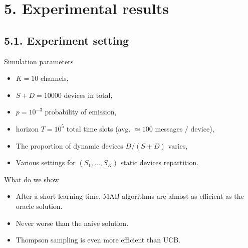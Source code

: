 \section{\hfill{}5. Experimental results\hfill{}}

\subsection{\hfill{}5.1. Experiment setting\hfill{}}

\begin{frameO}

    \begin{colorblock}{Simulation parameters}

        \begin{itemize}
            \tightlist
            \item
                  \(K = 10\) channels,
            \item
                  \(S + D = 10000\) devices in total,
            \item
                  \(p = 10^{-3}\) probability of emission,
            \item
                horizon \(T = 10^5\) total time slots (avg. \(\simeq 100\) messages \(/\)
                  device),
            \item
                  The proportion of dynamic devices \(D/(S+D)\) varies,
            \item
                  Various settings for \((S_1,\dots,S_{K})\) static devices
                  repartition.
        \end{itemize}

    \end{colorblock}

    \pause

    \begin{colorblock}{What do we show}

        \begin{itemize}
            \tightlist
            \item
                  After a short learning time, MAB algorithms are almost as efficient as
                  the oracle solution.
            \item
                  Never worse than the naive solution.
            \item
                  Thompson sampling is even more efficient than UCB.
        \end{itemize}

    \end{colorblock}

\end{frameO}



